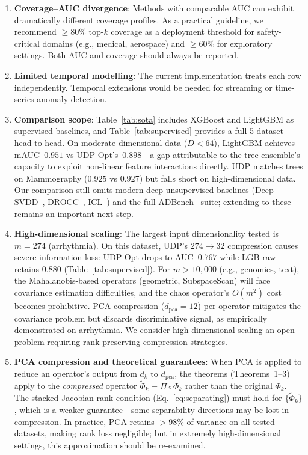 \documentclass[journal]{IEEEtran}
\begin{document}
\begin{enumerate}
  \item \textbf{Coverage--AUC divergence}: Methods with comparable AUC can exhibit dramatically different coverage profiles.  As a practical guideline, we recommend $\geq 80\%$ top-$k$ coverage as a deployment threshold for safety-critical domains (e.g., medical, aerospace) and $\geq 60\%$ for exploratory settings. Both AUC and coverage should always be reported.
  \item \textbf{Limited temporal modelling}: The current implementation treats each row independently. Temporal extensions would be needed for streaming or time-series anomaly detection.
  \item \textbf{Comparison scope}: Table~\ref{tab:sota} includes XGBoost and LightGBM as supervised baselines, and Table~\ref{tab:supervised} provides a full 5-dataset head-to-head.  On moderate-dimensional data ($D < 64$), LightGBM achieves mAUC~$0.951$ vs UDP-Opt's~$0.898$---a gap attributable to the tree ensemble's capacity to exploit non-linear feature interactions directly.  UDP matches trees on Mammography ($0.925$ vs $0.927$) but falls short on high-dimensional data.  Our comparison still omits modern deep unsupervised baselines (Deep SVDD~\cite{ruff2018deep}, DROCC~\cite{goyal2020drocc}, ICL~\cite{shenkar2022anomaly}) and the full ADBench~\cite{han2022adbench} suite; extending to these remains an important next step.
  \item \textbf{High-dimensional scaling}: The largest input dimensionality tested is $m{=}274$ (arrhythmia).  On this dataset, UDP's $274{\to}32$ compression causes severe information loss: UDP-Opt drops to AUC~$0.767$ while LGB-raw retains $0.880$ (Table~\ref{tab:supervised}).  For $m > 10{,}000$ (e.g., genomics, text), the Mahalanobis-based operators (geometric, SubspaceScan) will face covariance estimation difficulties, and the chaos operator's $O(m^2)$ cost becomes prohibitive.  PCA compression ($d_{\text{pca}}{=}12$) per operator mitigates the covariance problem but discards discriminative signal, as empirically demonstrated on arrhythmia.  We consider high-dimensional scaling an open problem requiring rank-preserving compression strategies.
  \item \textbf{PCA compression and theoretical guarantees}: When PCA is applied to reduce an operator's output from $d_k$ to $d_{\text{pca}}$, the theorems (Theorems~1--3) apply to the \emph{compressed} operator $\tilde{\Phi}_k = \Pi \circ \Phi_k$ rather than the original $\Phi_k$.  The stacked Jacobian rank condition (Eq.~\eqref{eq:separating}) must hold for $\{\tilde{\Phi}_k\}$, which is a weaker guarantee---some separability directions may be lost in compression.  In practice, PCA retains $>98\%$ of variance on all tested datasets, making rank loss negligible; but in extremely high-dimensional settings, this approximation should be re-examined.
\end{enumerate}
\end{document}
